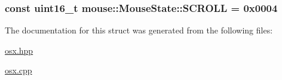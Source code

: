 \hypertarget{structosx_1_1mouse_1_1_mouse_state_a09e8666395882198d1bca0a745f216df}{
\subsubsection[{S\-C\-R\-O\-L\-L}]{\setlength{\rightskip}{0pt plus 5cm}const uint16\-\_\-t {\bf mouse\-::\-Mouse\-State\-::\-S\-C\-R\-O\-L\-L} = 0x0004}}\label{structosx_1_1mouse_1_1_mouse_state_a09e8666395882198d1bca0a745f216df}


The documentation for this struct was generated from the following files\-:\begin{DoxyCompactItemize}
\item 
\hyperlink{osx_8hpp}{osx.\-hpp}\item 
\hyperlink{osx_8cpp}{osx.\-cpp}\end{DoxyCompactItemize}
